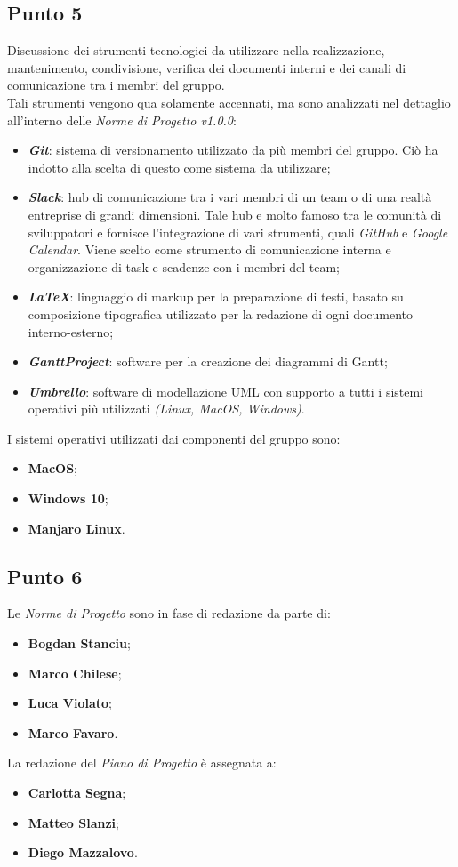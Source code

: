 \subsection{Punto 5}
Discussione dei strumenti tecnologici da utilizzare nella realizzazione, mantenimento, condivisione, verifica dei documenti interni e dei canali di comunicazione tra i membri del gruppo. \\
Tali strumenti vengono qua solamente accennati, ma sono analizzati nel dettaglio  all'interno delle \textit{Norme di Progetto v1.0.0}:
\begin{itemize}
	\item \textbf{\textit{Git}}: sistema di versionamento utilizzato da più membri del gruppo. Ciò ha indotto alla scelta di questo come sistema da utilizzare; 
	\item \textbf{\textit{Slack}}: hub di comunicazione tra i vari membri di un team o di una realtà entreprise di grandi dimensioni. Tale hub e molto famoso tra le comunità di sviluppatori e fornisce l'integrazione di vari strumenti, quali  				\textit{GitHub} e \textit{Google Calendar}. Viene scelto come strumento di comunicazione interna e organizzazione di task e scadenze con i membri del team; 
	\item \textbf{\textit{LaTeX}}: linguaggio di markup per la preparazione di testi, basato su  composizione tipografica utilizzato per la redazione di ogni documento interno-esterno; 
	\item \textbf{\textit{GanttProject}}: software per la creazione dei diagrammi di Gantt;
	\item \textbf{\textit{Umbrello}}: software di modellazione UML con supporto a tutti i sistemi operativi più utilizzati \textit{(Linux, MacOS, Windows)}.
\end{itemize}

I sistemi operativi utilizzati dai componenti del gruppo sono:
\begin{itemize}
	\item \textbf{MacOS};
	\item \textbf{Windows 10};
	\item \textbf{Manjaro Linux}.
\end{itemize}

\subsection{Punto 6}
Le \textit{Norme di Progetto} sono in fase di redazione da parte di: 
\begin{itemize}
	\item \textbf{Bogdan Stanciu};
	\item \textbf{Marco Chilese};
	\item \textbf{Luca Violato};
	\item \textbf{Marco Favaro}.
\end{itemize}

La redazione del \textit{Piano di Progetto} è assegnata a:
\begin{itemize}
	\item \textbf{Carlotta Segna};
	\item \textbf{Matteo Slanzi};
	\item \textbf{Diego Mazzalovo}.
\end{itemize}

